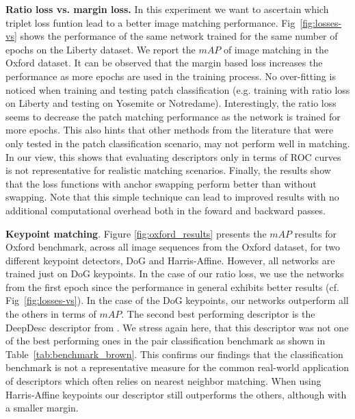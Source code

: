 \textbf{Ratio loss vs. margin loss.} In this experiment we want to ascertain which triplet loss funtion lead to a better image matching performance. Fig~\ref{fig:losses-vs} shows the performance of the same network trained for the same number of epochs on the Liberty dataset. We report the $mAP$  of image matching in the Oxford dataset. It can be observed that the margin based loss increases the performance as more epochs are used in the training process. No over-fitting is noticed when training and testing patch classification (e.g. training with ratio loss on Liberty and testing on Yosemite or Notredame). Interestingly, the ratio loss seems to decrease the patch matching performance as the network is trained for more epochs. This also hints that other methods from the literature that were only tested in the patch classification scenario, may not perform well in matching. In our view, this shows that evaluating descriptors only in terms of ROC curves is not representative for realistic matching scenarios. Finally, the results show that the loss functions with anchor swapping perform better than without swapping. Note that this simple technique can lead to improved results with no additional computational overhead both in the foward and backward passes.

\textbf{Keypoint matching}. Figure \ref{fig:oxford_results} presents the $mAP$ results for Oxford benchmark, across all image sequences from the Oxford dataset, for two different keypoint detectors, DoG and Harris-Affine. However, all networks are trained just on DoG keypoints. In the case of our ratio loss, we use the networks from the first epoch since the performance in general exhibits better results (cf. Fig~\ref{fig:losses-vs}). In the case of the DoG keypoints, our networks outperform
all the others in terms of $mAP$. The second best performing descriptor is the DeepDesc descriptor from \cite{simo2015deepdesc}. We stress again here, that this descriptor was not one of the best performing ones in the pair classification benchmark as shown in Table~\ref{tab:benchmark_brown}. This confirms our findings that the classification benchmark is not a representative measure for the  common real-world application of descriptors which often relies on nearest neighbor matching. When using
Harris-Affine keypoints our descriptor still outperforms the others, although with a smaller margin.


